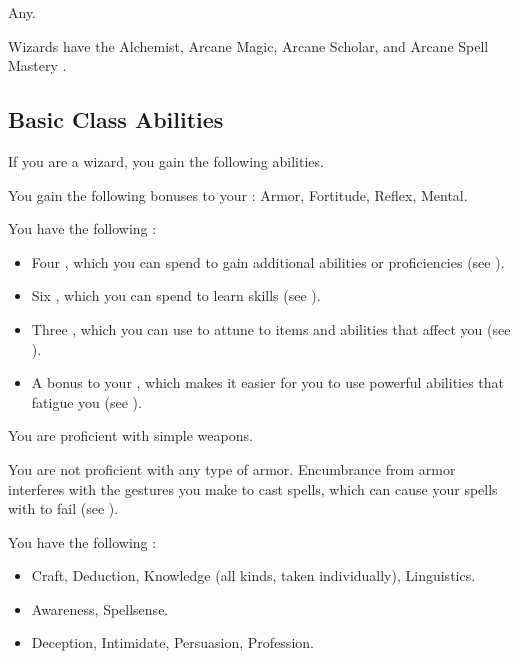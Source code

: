      Any.

     Wizards have the Alchemist, Arcane Magic, Arcane Scholar, and Arcane Spell Mastery .

    \subsection{Basic Class Abilities}
        If you are a wizard, you gain the following abilities.

        You gain the following bonuses to your :  Armor,  Fortitude,  Reflex,  Mental.

         You have the following :
        \begin{itemize}
            \item Four , which you can spend to gain additional abilities or proficiencies (see ).
            \item Six , which you can spend to learn skills (see ).
            \item Three , which you can use to attune to items and abilities that affect you (see ).
            \item A  bonus to your , which makes it easier for you to use powerful abilities that fatigue you (see ).
        \end{itemize}

        You are proficient with simple weapons.

        You are not proficient with any type of armor.
        Encumbrance from armor interferes with the gestures you make to cast spells, which can cause your spells with  to fail (see ).

        You have the following :
        \begin{itemize}
            \item {} Craft, Deduction, Knowledge (all kinds, taken individually), Linguistics.
            \item {} Awareness, Spellsense.
            \item {} Deception, Intimidate, Persuasion, Profession.
        \end{itemize}

